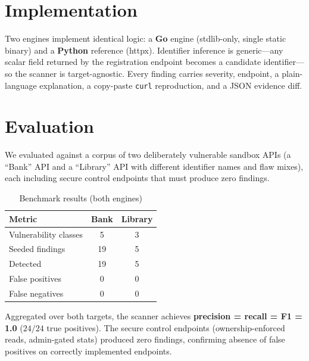 \documentclass[conference]{IEEEtran}
\begin{document}
\section{Implementation}
Two engines implement identical logic: a \textbf{Go} engine (stdlib-only,
single static binary) and a \textbf{Python} reference (httpx). Identifier
inference is generic---any scalar field returned by the registration endpoint
becomes a candidate identifier---so the scanner is target-agnostic. Every
finding carries severity, endpoint, a plain-language explanation, a copy-paste
\texttt{curl} reproduction, and a JSON evidence diff.

\section{Evaluation}
We evaluated against a corpus of two deliberately vulnerable sandbox APIs (a
``Bank'' API and a ``Library'' API with different identifier names and flaw
mixes), each including secure control endpoints that must produce zero findings.

\begin{table}[h]
\centering
\caption{Benchmark results (both engines)}
\begin{tabular}{lcc}
\toprule
\textbf{Metric} & \textbf{Bank} & \textbf{Library} \\
\midrule
Vulnerability classes & 5 & 3 \\
Seeded findings & 19 & 5 \\
Detected & 19 & 5 \\
False positives & 0 & 0 \\
False negatives & 0 & 0 \\
\bottomrule
\end{tabular}
\label{tab:results}
\end{table}

Aggregated over both targets, the scanner achieves
\textbf{precision = recall = F1 = 1.0} ($24/24$ true positives). The secure
control endpoints (ownership-enforced reads, admin-gated stats) produced zero
findings, confirming absence of false positives on correctly implemented
endpoints.
\end{document}
